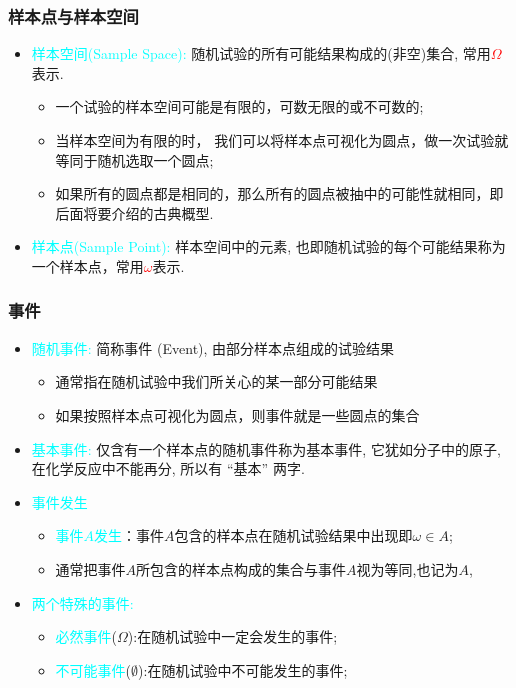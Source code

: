 \documentclass[Prob-All.tex]{subfiles}
\begin{document}
\begin{frame}
	\frametitle{样本点与样本空间}
	\begin{itemize}[<+-|alert@+>]
    \item \textcolor{cyan}{样本空间({\rm Sample Space}):} 随机试验的所有可能结果构成的(非空)集合, 常用\textcolor{red}{$\Omega$}表示.
    \begin{itemize}[<+-|alert@+>]
		\item 一个试验的样本空间可能是有限的，可数无限的或不可数的;
		\item 当样本空间为有限的时， 我们可以将样本点可视化为圆点，做一次试验就等同于随机选取一个圆点;
		\item 如果所有的圆点都是相同的，那么所有的圆点被抽中的可能性就相同，即后面将要介绍的古典概型.
	\end{itemize}
		\item \textcolor{cyan}{样本点({\rm Sample Point}):} 样本空间中的元素, 也即随机试验的每个可能结果称为一个样本点，常用\textcolor{red}{$\omega$}表示.


	\end{itemize}
\end{frame}




\begin{frame}
  \frametitle{事件}
  \begin{itemize}[<+-|alert@+>]

  \item \textcolor{cyan}{随机事件:} 简称事件 ({\rm Event}), 由部分样本点组成的试验结果
  \begin{itemize}[<+-|alert@+>]
  	\item 通常指在随机试验中我们所关心的某一部分可能结果
  	\item  如果按照样本点可视化为圆点，则事件就是一些圆点的集合
	\end{itemize}
  \item \textcolor{cyan}{基本事件:} 仅含有一个样本点的随机事件称为基本事件, 它犹如分子中的原子, 在化学反应中不能再分, 所以有 ``基本'' 两字.
  \item \textcolor{cyan}{事件发生}
    \begin{itemize}[<+-|alert@+>]
    \item \textcolor{cyan}{事件$A$发生}：事件$A$包含的样本点在随机试验结果中出现即$\omega\in A$;
    \item 通常把事件$A$所包含的样本点构成的集合与事件$A$视为等同,也记为$A$,
    \end{itemize}
  \item \textcolor{cyan}{两个特殊的事件:}
    \begin{itemize}[<+-|alert@+>]
    \item \textcolor{cyan}{必然事件}($\Omega$):在随机试验中一定会发生的事件;
    \item \textcolor{cyan}{不可能事件}($\emptyset$):在随机试验中不可能发生的事件;
    \end{itemize}
  \end{itemize}
\end{frame}
\end{document}
